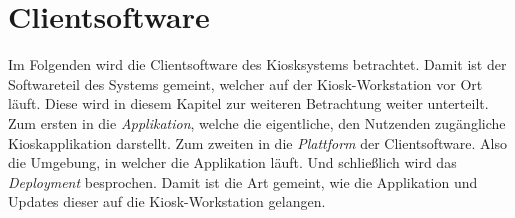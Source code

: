 \section{Clientsoftware}
\label{sec:frontend}

Im Folgenden wird die Clientsoftware des Kiosksystems betrachtet. Damit ist der 
Softwareteil des Systems gemeint, welcher auf der Kiosk-Workstation vor 
Ort läuft. Diese wird in diesem Kapitel zur weiteren Betrachtung 
weiter unterteilt. Zum ersten in die \emph{Applikation}, 
welche die eigentliche, den Nutzenden zugängliche Kioskapplikation darstellt.
Zum zweiten in die \emph{Plattform} der Clientsoftware.
Also die Umgebung, in welcher die Applikation läuft.
Und schließlich wird das \emph{Deployment} besprochen. Damit ist die Art gemeint,
wie die Applikation und Updates dieser auf die Kiosk-Workstation gelangen.\\




